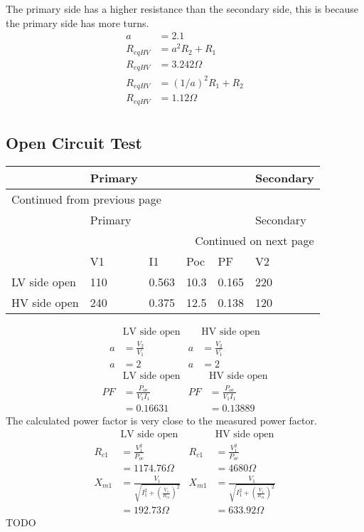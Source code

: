 \documentclass[11pt]{article}
\begin{document}
The primary side has a higher resistance than the secondary side, this is because the primary side has more turns.
\begin{align*}
a&=2.1 \\
R_{eqHV}&=a^{2}R_2+R_1\\
R_{eqHV}&=3.242\Omega \\
R_{eqHV}&=(1/a)^{2}R_1+R_2\\
R_{eqHV}&=1.12\Omega \\
\end{align*}
\subsection{Open Circuit Test}
\label{sec:org7789cf2}
\begin{longtable}{|l|l|l|l|l|l|}
\hline
 & Primary &  &  &  & Secondary\\
\hline
\endfirsthead
\multicolumn{6}{l}{Continued from previous page} \\
\hline

 & Primary &  &  &  & Secondary \\

\hline
\endhead
\hline\multicolumn{6}{r}{Continued on next page} \\
\endfoot
\endlastfoot
\hline
 & V1 & I1 & Poc & PF & V2\\
\hline
LV side open & 110 & 0.563 & 10.3 & 0.165 & 220\\
\hline
HV side open & 240 & 0.375 & 12.5 & 0.138 & 120\\
\hline
\end{longtable}

\begin{align*}
&\textrm{LV side open} & &\textrm{HV side open} \\
a&=\frac{V_{2}}{V_{1}} & a&=\frac{V_{2}}{V_{1}} \\
a&=2 & a&=2
\end{align*}
\begin{align*}
&\textrm{LV side open} & &\textrm{HV side open} \\
PF&=\frac{P_{oc}}{V_1I_1} & PF&=\frac{P_{oc}}{V_1I_1} \\
&=0.16631 & &= 0.13889
\end{align*}
The calculated power factor is very close to the measured power factor.
\begin{align*}
&\textrm{LV side open} & &\textrm{HV side open} \\
R_{c1}&=\frac{V_1^2}{P_{oc}} & R_{c1}&=\frac{V_1^2}{P_{oc}} \\
&=1174.76\Omega & &=4680\Omega \\
X_{m1}&=\frac{V_1}{\sqrt{I_1^2+\left(\frac{V_1}{R_{c1}}\right)^2}} & X_{m1}&=\frac{V_1}{\sqrt{I_1^2+\left(\frac{V_1}{R_{c1}}\right)^2}} \\
&=192.73\Omega & &=633.92\Omega
\end{align*}
TODO
\end{document}
